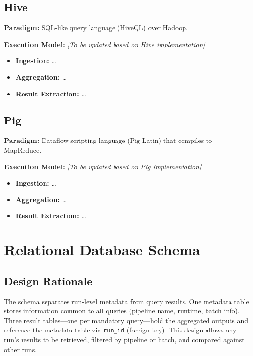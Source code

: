 \documentclass[11pt,a4paper]{article}
\begin{document}
\vspace{5pt}

\subsection{Hive}
\begin{hivebox}
\textbf{Paradigm:} SQL-like query language (HiveQL) over Hadoop.

\textbf{Execution Model:} 
\textit{[To be updated based on Hive implementation]}
\begin{itemize}
  \item \textbf{Ingestion:} \dots
  \item \textbf{Aggregation:} \dots
  \item \textbf{Result Extraction:} \dots
\end{itemize}
\end{hivebox}

\vspace{5pt}

\subsection{Pig}
\begin{pigbox}
\textbf{Paradigm:} Dataflow scripting language (Pig Latin) that compiles to MapReduce.

\textbf{Execution Model:} 
\textit{[To be updated based on Pig implementation]}
\begin{itemize}
  \item \textbf{Ingestion:} \dots
  \item \textbf{Aggregation:} \dots
  \item \textbf{Result Extraction:} \dots
\end{itemize}
\end{pigbox}

\section{Relational Database Schema}

\subsection{Design Rationale}

The schema separates run-level metadata from query results. One metadata table stores information common to all queries (pipeline name, runtime, batch info). Three result tables---one per mandatory query---hold the aggregated outputs and reference the metadata table via \texttt{run\_id} (foreign key). This design allows any run's results to be retrieved, filtered by pipeline or batch, and compared against other runs.
\end{document}
